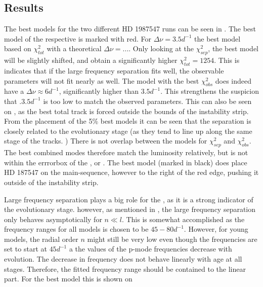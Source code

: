 \subsection{Results}
The best models for the two different HD 1987547 runs can be seen in . The best model of the respective \chis is marked with red. For $\Delta \nu=3.5 d^{-1}$ the best model based on $\chi_{tot}^2$ with a theoretical $\Delta \nu = ...$. Only looking at the $\chi_{sep}^2$, the best model will be slightly shifted, and obtain a significantly higher $\chi_{tot}^2=1254$. This is indicates that if the large frequency separation fits well, the observable parameters will not fit nearly as well. The model with the best $\chi_{obs}^2$ does indeed have a $\Delta\nu \approx 6d^{-1}$, significantly higher than $3.5d^{-1}$. This strengthens the suspicion that $.3.5 d^{-1}$ is too low to match the observed parameters. This can also be seen on , as the best total track is forced outside the bounds of the instability strip.  From the placement of the 5\% best models it can be seen that the separation is closely related to the evolutionary stage (as they tend to line up along the same stage of the tracks. ) There is not overlap between the models for $\chi_{sep}^2$ and $\chi_{obs}^2$. The best combined modes therefore match the luminosity relatively, but is not within the errrorbox of the \teff, or \lum. The best model (marked in black) does place HD 187547 on the main-sequence, however to the right of the red edge, pushing it outside of the instability strip. 

Large frequency separation plays a big role for the \chis, as it is a strong indicator of the evolutionary stage. however, as mentioned in , the large frequency separation only behaves asymptotically for $n \ll l$. This is somewhat accomplished as the frequency ranges for all models is chosen to be $45-80d^{-1}$. However, for young models, the radial order $n$ might still be very low even though the frequencies are set to start at $45 d^{-1}$ a the values of the p-mode frequencies decrease with evolution. The decrease in frequency does not behave linearly with age at all stages. Therefore, the fitted frequency range should be contained to the linear part. For the best model this is shown on %


